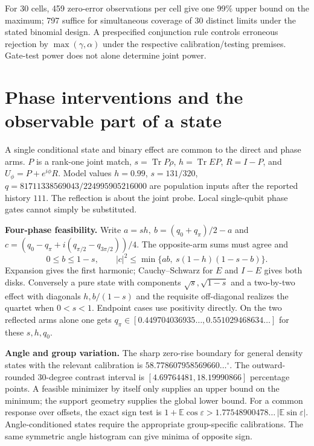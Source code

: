 \documentclass[
  10pt,
  a4paper,
]{article}
\begin{document}
For 30 cells, 459 zero-error observations per cell give one 99\% upper bound on the maximum; 797 suffice for simultaneous coverage of 30 distinct limits under the stated binomial design. A prespecified conjunction rule controls erroneous rejection by \(\max(\gamma,\alpha)\) under the respective calibration/testing premises. Gate-test power does not alone determine joint power.

\newpage

\section{Phase interventions and the observable part of a state}\label{phase-interventions-and-the-observable-part-of-a-state}

A single conditional state and binary effect are common to the direct and phase arms. \(P\) is a rank-one joint match, \(s=\operatorname{Tr}P\rho\), \(h=\operatorname{Tr}EP\), \(R=I-P\), and \(U_\phi=P+e^{i\phi}R\). Model values \(h=0.99\), \(s=131/320\), \(q=81711338569043/224995905216000\) are population inputs after the reported history \(111\). The reflection is about the joint probe. Local single-qubit phase gates cannot simply be substituted.

\textbf{Four-phase feasibility.} Write \(a=sh,\ b=(q_0+q_\pi)/2-a\) and \(c=(q_0-q_\pi+i(q_{\pi/2}-q_{3\pi/2}))/4\). The opposite-arm sums must agree and \[
 0\le b\le1-s,\qquad |c|^2\le\min\{ab,\ s(1-h)(1-s-b)\}.
\] Expansion gives the first harmonic; Cauchy--Schwarz for \(E\) and \(I-E\) gives both disks. Conversely a pure state with components \(\sqrt s,\sqrt{1-s}\) and a two-by-two effect with diagonals \(h,b/(1-s)\) and the requisite off-diagonal realizes the quartet when \(0<s<1\). Endpoint cases use positivity directly. On the two reflected arms alone one gets \(q_\pi\in[0.449704036935\ldots,0.551029468634\ldots]\) for these \(s,h,q_0\).

\textbf{Angle and group variation.} The sharp zero-rise boundary for general density states with the relevant calibration is \(58.778607958569660\ldots^\circ\). The outward-rounded 30-degree contrast interval is \([4.69764481,18.19990866]\) percentage points. A feasible minimizer by itself only supplies an upper bound on the minimum; the support geometry supplies the global lower bound. For a common response over offsets, the exact sign test is \(1+\mathbb E\cos\varepsilon>1.77548900478\ldots\,|\mathbb E\sin\varepsilon|\). Angle-conditioned states require the appropriate group-specific calibrations. The same symmetric angle histogram can give minima of opposite sign.
\end{document}
